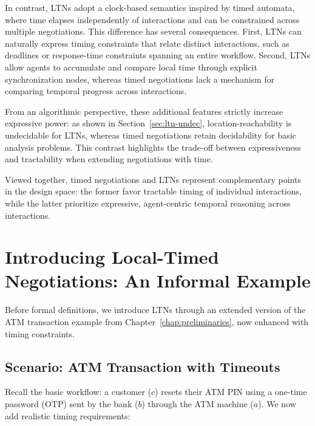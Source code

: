 In contrast, LTNs adopt a clock-based semantics inspired by timed automata,
where time elapses independently of interactions and can be constrained
across multiple negotiations.  This difference has several consequences.
First, LTNs can naturally express timing constraints that relate distinct
interactions, such as deadlines or response-time constraints spanning an
entire workflow.  Second, LTNs allow agents to accumulate and compare local
time through explicit synchronization nodes, whereas timed negotiations
lack a mechanism for comparing temporal progress across interactions.

From an algorithmic perspective, these additional features strictly
increase expressive power: as shown in Section~\ref{sec:ltn-undec},
location-reachability is undecidable for LTNs, whereas timed negotiations
retain decidability for basic analysis problems.  This contrast highlights
the trade-off between expressiveness and tractability when extending
negotiations with time.

Viewed together, timed negotiations and LTNs represent complementary
points in the design space: the former favor tractable timing of
individual interactions, while the latter prioritize expressive,
agent-centric temporal reasoning across interactions.


\section{Introducing Local-Timed Negotiations: An Informal Example}
\label{sec:ltn-example-informal}

Before formal definitions, we introduce LTNs through an extended version of the ATM transaction example from Chapter~\ref{chap:preliminaries}, now enhanced with timing constraints.

\subsection{Scenario: ATM Transaction with Timeouts}

Recall the basic workflow: a customer ($c$) resets their ATM PIN using a one-time password (OTP) sent by the bank ($b$) through the ATM machine ($a$). We now add realistic timing requirements:

